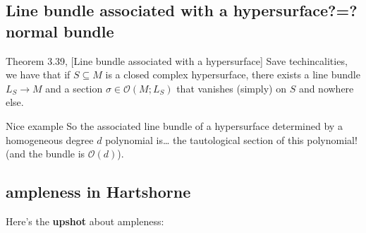 \subsection*{Line bundle associated with a hypersurface?=?normal bundle}

\begin{thing4}{Theorem 3.39, \cite{lec}}[Line bundle associated with a hypersurface]\label{thm:3.39, lec}\leavevmode
Save techincalities, we have that if \(S \subseteq M\) is a closed complex hypersurface, there exists a line bundle \(L_S \to M\) and a section \(\sigma \in \mathcal{O}(M;L_S)\) that vanishes (simply) on \(S\) and nowhere else.
\end{thing4}

\begin{thing8}{Nice example}\leavevmode
So the associated line bundle of a hypersurface determined by a homogeneous degree \(d\) polynomial is… the tautological section of this polynomial! (and the bundle is \(\mathcal{O}(d)\)).
\end{thing8}




\subsection*{ampleness in Hartshorne}

Here's the \textbf{upshot} about ampleness:

